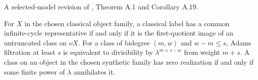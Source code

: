 \begin{proposition}
\label{sem:Literature:selected-lifts}
A selected-model revision of \cite{BHS}, Theorem A.1 and Corollary A.19.\par

For $X$ in the chosen classical object family, a classical label has a common infinite-cycle representative if and only if it is the first-quotient image of an untruncated class on $\nu X$. For a class of bidegree $(m,w)$ and $w-m\le s$, Adams filtration at least $s$ is equivalent to divisibility by $\lambda^{m+s-w}$ from weight $m+s$. A class on an object in the chosen synthetic family has zero realization if and only if some finite power of $\lambda$ annihilates it.
\end{proposition}


